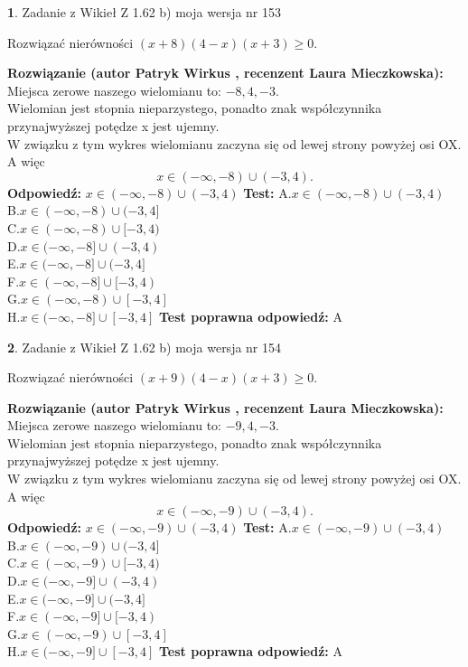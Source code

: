 \documentclass[12pt, a4paper]{article}
\theoremstyle{definition} %
\newtheorem{zad}{}
\newcommand{\zadStart}[1]{\begin{zad}#1\newline}
\newcommand{\zadStop}{\end{zad}}
\newcommand{\rozwStart}[2]{\noindent \textbf{Rozwiązanie (autor #1 , recenzent #2): }\newline}
\newcommand{\rozwStop}{\newline}
\newcommand{\odpStart}{\noindent \textbf{Odpowiedź:}\newline}
\newcommand{\odpStop}{\newline}
\newcommand{\testStart}{\noindent \textbf{Test:}\newline}
\newcommand{\testStop}{\newline}
\newcommand{\kluczStart}{\noindent \textbf{Test poprawna odpowiedź:}\newline}
\newcommand{\kluczStop}{\newline}
\begin{document}
\zadStart{Zadanie z Wikieł Z 1.62 b) moja wersja nr 153}

Rozwiązać nierówności $(x+8)(4-x)(x+3)\ge0$.
\zadStop
\rozwStart{Patryk Wirkus}{Laura Mieczkowska}
Miejsca zerowe naszego wielomianu to: $-8, 4, -3$.\\
Wielomian jest stopnia nieparzystego, ponadto znak współczynnika przy\linebreak najwyższej potędze x jest ujemny.\\ W związku z tym wykres wielomianu zaczyna się od lewej strony powyżej osi OX. A więc $$x \in (-\infty,-8) \cup (-3,4).$$
\rozwStop
\odpStart
$x \in (-\infty,-8) \cup (-3,4)$
\odpStop
\testStart
A.$x \in (-\infty,-8) \cup (-3,4)$\\
B.$x \in (-\infty,-8) \cup (-3,4]$\\
C.$x \in (-\infty,-8) \cup [-3,4)$\\
D.$x \in (-\infty,-8] \cup (-3,4)$\\
E.$x \in (-\infty,-8] \cup (-3,4]$\\
F.$x \in (-\infty,-8] \cup [-3,4)$\\
G.$x \in (-\infty,-8) \cup [-3,4]$\\
H.$x \in (-\infty,-8] \cup [-3,4]$
\testStop
\kluczStart
A
\kluczStop



\zadStart{Zadanie z Wikieł Z 1.62 b) moja wersja nr 154}

Rozwiązać nierówności $(x+9)(4-x)(x+3)\ge0$.
\zadStop
\rozwStart{Patryk Wirkus}{Laura Mieczkowska}
Miejsca zerowe naszego wielomianu to: $-9, 4, -3$.\\
Wielomian jest stopnia nieparzystego, ponadto znak współczynnika przy\linebreak najwyższej potędze x jest ujemny.\\ W związku z tym wykres wielomianu zaczyna się od lewej strony powyżej osi OX. A więc $$x \in (-\infty,-9) \cup (-3,4).$$
\rozwStop
\odpStart
$x \in (-\infty,-9) \cup (-3,4)$
\odpStop
\testStart
A.$x \in (-\infty,-9) \cup (-3,4)$\\
B.$x \in (-\infty,-9) \cup (-3,4]$\\
C.$x \in (-\infty,-9) \cup [-3,4)$\\
D.$x \in (-\infty,-9] \cup (-3,4)$\\
E.$x \in (-\infty,-9] \cup (-3,4]$\\
F.$x \in (-\infty,-9] \cup [-3,4)$\\
G.$x \in (-\infty,-9) \cup [-3,4]$\\
H.$x \in (-\infty,-9] \cup [-3,4]$
\testStop
\kluczStart
A
\kluczStop
\end{document}
